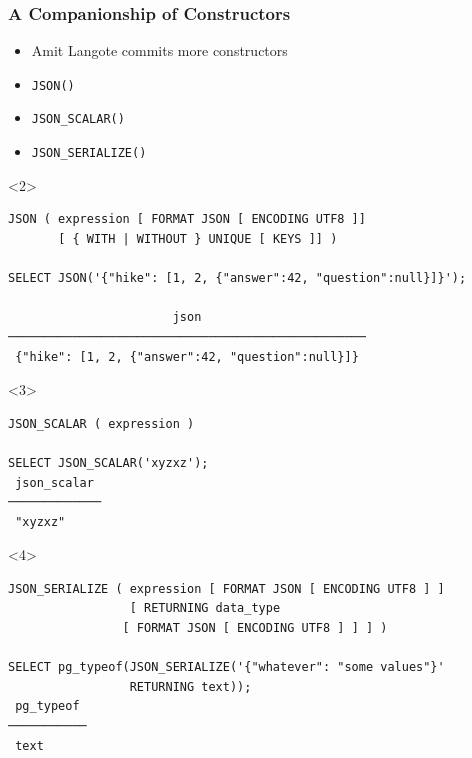 \begin{frame}[fragile]
  \frametitle{A Companionship of Constructors}

  \begin{itemize}
    \item Amit Langote commits more constructors

    \item \texttt{JSON()}
    \item \texttt{JSON\_SCALAR()}
    \item \texttt{JSON\_SERIALIZE()}
  \end{itemize}

  \begin{onlyenv}<2>
    \begin{lstlisting}
JSON ( expression [ FORMAT JSON [ ENCODING UTF8 ]]
       [ { WITH | WITHOUT } UNIQUE [ KEYS ]] )
    
SELECT JSON('{"hike": [1, 2, {"answer":42, "question":null}]}');

                       json                       
──────────────────────────────────────────────────
 {"hike": [1, 2, {"answer":42, "question":null}]}
    \end{lstlisting}
  \end{onlyenv}

  \begin{onlyenv}<3>
    \begin{lstlisting}
JSON_SCALAR ( expression )

SELECT JSON_SCALAR('xyzxz');
 json_scalar 
─────────────
 "xyzxz"
    \end{lstlisting}
  \end{onlyenv}

  \begin{onlyenv}<4>
    \begin{lstlisting}
JSON_SERIALIZE ( expression [ FORMAT JSON [ ENCODING UTF8 ] ]
                 [ RETURNING data_type
		        [ FORMAT JSON [ ENCODING UTF8 ] ] ] )
			
SELECT pg_typeof(JSON_SERIALIZE('{"whatever": "some values"}'
                 RETURNING text));
 pg_typeof 
───────────
 text
    \end{lstlisting}
  \end{onlyenv}
\end{frame} 

